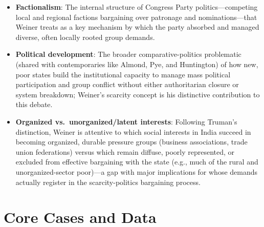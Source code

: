 \documentclass[12pt]{article}
\begin{document}
\begin{itemize}[leftmargin=*, itemsep=4pt]
    \item \textbf{Factionalism}: The internal structure of Congress Party politics---competing local and regional factions bargaining over patronage and nominations---that Weiner treats as a key mechanism by which the party absorbed and managed diverse, often locally rooted group demands.
    \item \textbf{Political development}: The broader comparative-politics problematic (shared with contemporaries like Almond, Pye, and Huntington) of how new, poor states build the institutional capacity to manage mass political participation and group conflict without either authoritarian closure or system breakdown; Weiner's scarcity concept is his distinctive contribution to this debate.
    \item \textbf{Organized vs.\ unorganized/latent interests}: Following Truman's distinction, Weiner is attentive to which social interests in India succeed in becoming organized, durable pressure groups (business associations, trade union federations) versus which remain diffuse, poorly represented, or excluded from effective bargaining with the state (e.g., much of the rural and unorganized-sector poor)---a gap with major implications for whose demands actually register in the scarcity-politics bargaining process.
\end{itemize}

\section{Core Cases and Data}
\end{document}
